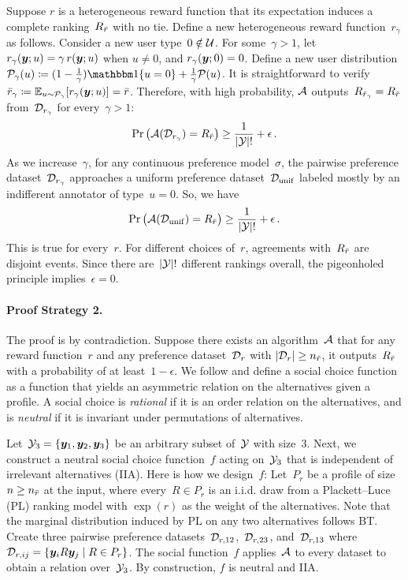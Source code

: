 \begin{proofEnd}
    Suppose $r$ is a heterogeneous reward function that its expectation induces a complete ranking~$R_{\bar{r}}$ with no tie. Define a new heterogeneous reward function~$r_\gamma$ as follows. Consider a new user type~$0 \notin {\mathcal{U}}$. For some~$\gamma > 1$, let $r_\gamma({\bm{y}}; u) = \gamma\,r({\bm{y}}; u)$ when $u \neq 0$, and $r_\gamma({\bm{y}}; 0) = 0$. Define a new user distribution~$\gP_\gamma(u) \coloneqq (1-\frac{1}{\gamma}) \One\{u=0\} + \frac{1}{\gamma}\gP(u)$. It is straightforward to verify ${\bar{r}}_\gamma \coloneqq \mathbb{E}_{u\sim{\mathcal{P}}_\gamma}[r_\gamma({\bm{y}}; u)] = {\bar{r}}$. Therefore, with high probability, ${\mathcal{A}}$ outputs~$R_{{\bar{r}}_\gamma}=R_{{\bar{r}}}$ from~${\mathcal{D}}_{r_\gamma}$ for every~$\gamma > 1$:
    \begin{equation*}
        \Pr\big({\mathcal{A}}({\mathcal{D}}_{r_\gamma}) = R_{\bar{r}}\big) \ge \frac{1}{|{\mathcal{Y}}|!} + \epsilon
        \,.
    \end{equation*}
    As we increase~$\gamma$, for any continuous preference model~$\sigma$, the pairwise preference dataset~${\mathcal{D}}_{r_\gamma}$ approaches a uniform preference dataset~${\mathcal{D}}_{\rm unif}$ labeled mostly by an indifferent annotator of type~$u=0$. So, we have
    \begin{equation}
        \Pr\big({\mathcal{A}}({\mathcal{D}}_{\rm unif}) = R_{\bar{r}}\big) \ge \frac{1}{|{\mathcal{Y}}|!} + \epsilon
        \,.
    \end{equation}
    This is true for every~$r$. For different choices of~$r$, agreements with~$R_{\bar{r}}$ are disjoint events. Since there are~$|{\mathcal{Y}}|!$ different rankings overall, the pigeonholed principle implies~$\epsilon = 0$. 

    \paragraph{Proof Strategy 2.}
    The proof is by contradiction. Suppose there exists an algorithm~${\mathcal{A}}$ that for any reward function~$r$ and any preference dataset~${\mathcal{D}}_r$ with $|{\mathcal{D}}_r| \ge n_{\bar{r}}$, it outputs~$R_{\bar{r}}$ with a probability of at least~$1-\epsilon$.
    We follow \citet{friedgut2002boolean} and define a social choice function as a function that yields an asymmetric relation on the alternatives given a profile. A social choice is \emph{rational} if it is an order relation on the alternatives, and is \emph{neutral} if it is invariant under permutations of alternatives.
    
    Let~${\mathcal{Y}}_3 = \{{\bm{y}}_1, {\bm{y}}_2, {\bm{y}}_3\}$ be an arbitrary subset of~${\mathcal{Y}}$ with size~$3$. Next, we construct a neutral social choice function~$f$ acting on~${\mathcal{Y}}_3$ that is independent of irrelevant alternatives (IIA). Here is how we design~$f$: Let~$P_r$ be a profile of size~$n \ge n_{\bar{r}}$ at the input, where every~$R \in P_r$ is an i.i.d. draw from a Plackett–Luce (PL) ranking model with $\exp(r)$ as the weight of the alternatives. Note that the marginal distribution induced by PL on any two alternatives follows BT. Create three pairwise preference datasets~${\mathcal{D}}_{r,12}$,~${\mathcal{D}}_{r,23}$, and~${\mathcal{D}}_{r,13}$ where~${\mathcal{D}}_{r, ij} = \{{\bm{y}}_i R {\bm{y}}_j \mid R \in P_r\}$. The social function~$f$ applies~${\mathcal{A}}$ to every dataset to obtain a relation over~${\mathcal{Y}}_3$. By construction, $f$ is neutral and IIA. 
    

\end{proofEnd}

